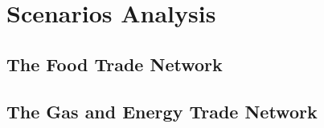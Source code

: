 \chapter{Scenarios Analysis}

\section{The Food Trade Network}
\section{The Gas and Energy Trade Network}